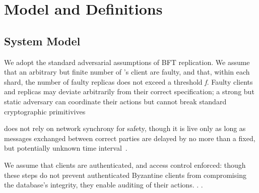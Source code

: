 \section{Model and Definitions}


\subsection{System Model}

We adopt the standard adversarial assumptions of BFT replication. We assume that an arbitrary but finite number of \sys's client are faulty, and that, within each shard, the number of faulty replicas does not exceed a threshold \textit{f}. Faulty clients and replicas may deviate arbitrarily from their correct specification; a strong but static adversary can coordinate their actions but cannot break standard cryptographic primitivives

\sys{} does not rely on network synchrony for safety, though it is live only as long as messages exchanged between correct parties are delayed by no more than a fixed, but potentially unknown time interval~\cite{castro1999practical, fischer1985impossibility, kotla2007zyzzyva, clement2009making, buchman2016tendermint}.

We assume that clients are authenticated, and access control enforced: though these steps do not prevent  authenticated Byzantine clients from compromising the database's integrity, they enable auditing of their actions. . .



